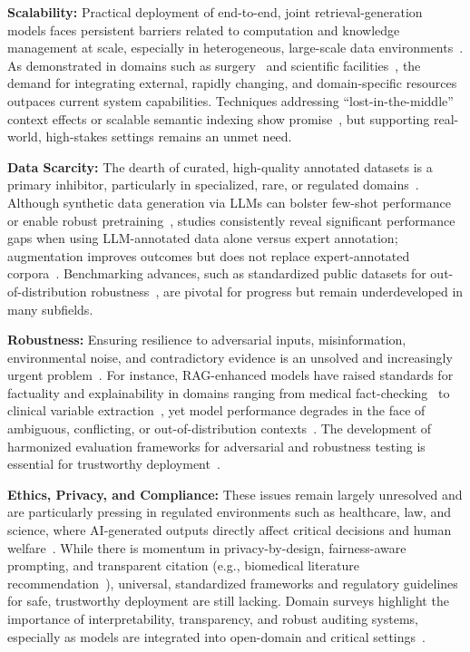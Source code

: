 \documentclass[sigconf]{acmart}
\begin{document}
\textbf{Scalability:} Practical deployment of end-to-end, joint retrieval-generation models faces persistent barriers related to computation and knowledge management at scale, especially in heterogeneous, large-scale data environments~\cite{ref1,ref4,ref7,ref10,ref21,ref29,ref38,ref46,ref49,ref51,ref52,ref54,ref61,ref62}. As demonstrated in domains such as surgery~\cite{ref1} and scientific facilities~\cite{ref30}, the demand for integrating external, rapidly changing, and domain-specific resources outpaces current system capabilities. Techniques addressing “lost-in-the-middle” context effects or scalable semantic indexing show promise~\cite{ref10,ref45,ref49}, but supporting real-world, high-stakes settings remains an unmet need.

\textbf{Data Scarcity:} The dearth of curated, high-quality annotated datasets is a primary inhibitor, particularly in specialized, rare, or regulated domains~\cite{ref8,ref16,ref19,ref22,ref26,ref28,ref31,ref34,ref36}. Although synthetic data generation via LLMs can bolster few-shot performance or enable robust pretraining~\cite{ref16,ref22,ref34,ref61}, studies consistently reveal significant performance gaps when using LLM-annotated data alone versus expert annotation; augmentation improves outcomes but does not replace expert-annotated corpora~\cite{ref51,ref52}. Benchmarking advances, such as standardized public datasets for out-of-distribution robustness~\cite{ref26}, are pivotal for progress but remain underdeveloped in many subfields.

\textbf{Robustness:} Ensuring resilience to adversarial inputs, misinformation, environmental noise, and contradictory evidence is an unsolved and increasingly urgent problem~\cite{ref2,ref3,ref7,ref37,ref39,ref49,ref51,ref54}. For instance, RAG-enhanced models have raised standards for factuality and explainability in domains ranging from medical fact-checking~\cite{ref54} to clinical variable extraction~\cite{ref3}, yet model performance degrades in the face of ambiguous, conflicting, or out-of-distribution contexts~\cite{ref49,ref26}. The development of harmonized evaluation frameworks for adversarial and robustness testing is essential for trustworthy deployment~\cite{ref26,ref49}.

\textbf{Ethics, Privacy, and Compliance:} These issues remain largely unresolved and are particularly pressing in regulated environments such as healthcare, law, and science, where AI-generated outputs directly affect critical decisions and human welfare~\cite{ref6,ref13,ref23,ref30,ref37,ref45,ref55,ref62,ref63}. While there is momentum in privacy-by-design, fairness-aware prompting, and transparent citation (e.g., biomedical literature recommendation~\cite{ref6}), universal, standardized frameworks and regulatory guidelines for safe, trustworthy deployment are still lacking. Domain surveys highlight the importance of interpretability, transparency, and robust auditing systems, especially as models are integrated into open-domain and critical settings~\cite{ref13,ref63}.
\end{document}

